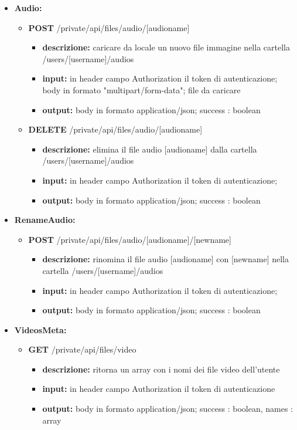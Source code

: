 {{\begin{itemize}
		\item \textbf{Audio:}
			\begin{itemize}
			\item    \textbf{POST} /private/api/files/audio/[audioname]
				\begin{itemize} 
				\item \textbf{descrizione:} caricare da locale un nuovo file immagine nella cartella /users/[username]/audios					
				\item \textbf{input:} in header campo Authorization il token di autenticazione; body in formato "multipart/form-data"; file da caricare
				\item \textbf{output:} body in formato application/json; success : boolean
				\end{itemize}
			\item   \textbf{DELETE} /private/api/files/audio/[audioname]
				\begin{itemize} 
				\item \textbf{descrizione:} elimina il file audio [audioname] dalla cartella /users/[username]/audios			
				\item \textbf{input:} in header campo Authorization il token di autenticazione;
				\item \textbf{output:} body in formato application/json; success : boolean
				\end{itemize}
			\end{itemize}
			
		\item \textbf{RenameAudio:}
			\begin{itemize}
			\item   \textbf{POST} /private/api/files/audio/[audioname]/[newname] 
				\begin{itemize} 
				\item \textbf{descrizione:} rinomina il file audio [audioname] con [newname] nella cartella /users/[username]/audios
				\item \textbf{input:} in header campo Authorization il token di autenticazione;
				\item \textbf{output:} body in formato application/json; success : boolean
				\end{itemize}
			\end{itemize}
						
		\item \textbf{VideosMeta:}
			\begin{itemize}
			\item   \textbf{GET} /private/api/files/video
				\begin{itemize} 
				\item \textbf{descrizione:} ritorna un array con i nomi dei file video dell'utente
				\item \textbf{input:} in header campo Authorization il token di autenticazione
				\item \textbf{output:} body in formato application/json; success : boolean, names : array
				\end{itemize}
			\end{itemize}
			

\end{itemize}}}
